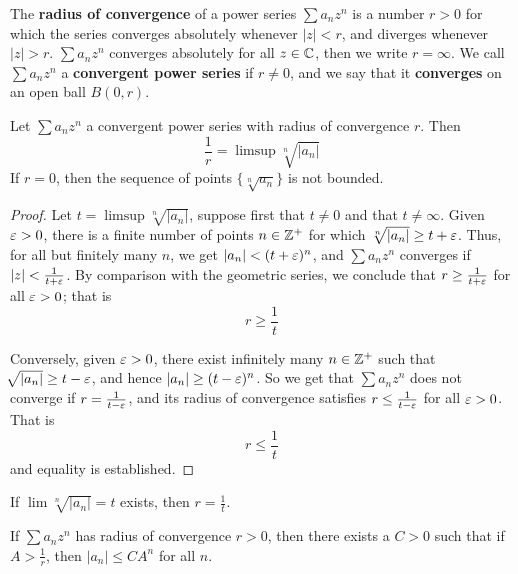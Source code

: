 \begin{definition}
    The \textbf{radius of convergence} of a power series $\sum{a_nz^n}$ is a
    number $r>0$ for which the series converges absolutely whenever $|z|<r$, and
    diverges whenever $|z|>r$. $\sum{a_nz^n}$ converges absolutely for all $z
    \in \mathbb{C}$, then we write  $r=\infty$. We call  $\sum{a_nz^n}$ a
    \textbf{convergent power series} if $r \neq 0$, and we say that it
    \textbf{converges} on an open ball $B(0,r)$.
\end{definition}

\begin{theorem}\label{2.2.11}
    Let $\sum{a_nz^n}$ a convergent power series with radius of convergence $r$.
    Then
    \begin{equation*}
        \frac{1}{r}=\limsup{\sqrt[n]{|a_n|}}
    \end{equation*}
    If $r=0$, then the sequence of points $\{\sqrt[n]{a_n}\}$ is not bounded.
\end{theorem}
\begin{proof}
    Let $t=\limsup{\sqrt[n]{|a_n|}}$, suppose first that $t \neq 0$ and that  $t
    \neq \infty$. Given  $\varepsilon>0$, there is a finite number of points  $n \in
    \mathbb{Z}^+$ for which $\sqrt[n]{|a_n|} \geq t+\varepsilon$. Thus, for all but finitely many
    $n$, we get $|a_n|<(t+\varepsilon)^n$, and $\sum{a_nz^n}$ converges if
    $|z|<\frac{1}{t+\varepsilon}$. By comparison with the geometric series, we conclude
    that $r \geq \frac{1}{t+\varepsilon}$ for all $\varepsilon>0$; that is
    \begin{equation*}
        r \geq \frac{1}{t}
    \end{equation*}

    Conversely, given $\varepsilon>0$, there exist infinitely many  $n \in \mathbb{Z}^+$ such
    that  $\sqrt[]{|a_n|} \geq t-\varepsilon$, and hence $|a_n| \geq (t-\varepsilon)^n$. So we get
    that $\sum{a_nz^n}$ does not converge if $r=\frac{1}{t-\varepsilon}$, and its radius
    of convergence satisfies $r \leq \frac{1}{t-\varepsilon}$ for all $\varepsilon>0$. That is
    \begin{equation*}
        r \leq \frac{1}{t}
    \end{equation*}
    and equality is established.
\end{proof}
\begin{corollary}
    If $\lim{\sqrt[n]{|a_n|}}=t$ exists, then $r=\frac{1}{t}$.
\end{corollary}
\begin{corollary}
    If $\sum{a_nz^n}$ has radius of convergence $r>0$, then there exists a
    $C>0$ such that if  $A>\frac{1}{r}$, then $|a_n| \leq CA^n$ for all  $n$.
\end{corollary}

